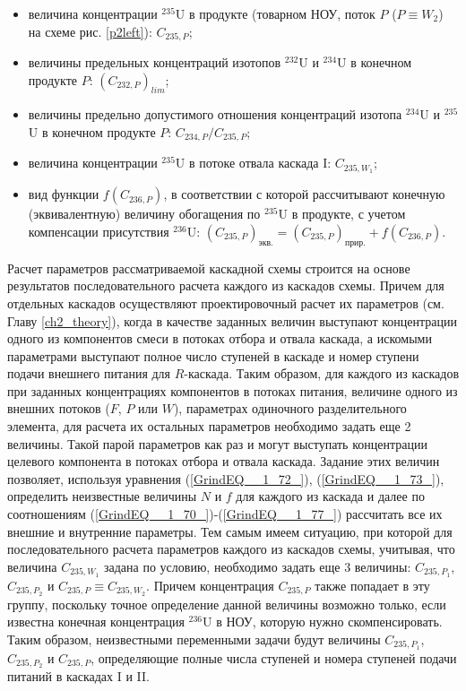 \begin{itemize}
    \item величина концентрации $^{235}$U в продукте (товарном НОУ, поток $P$ ($P \equiv W_2$) на схеме рис. \ref{p2left}): $C_{235,{P}}$;
    \item величины предельных концентраций изотопов $^{232}$U и $^{234}$U в конечном продукте $P$: $(C_{232,{P}})_{lim}$;
    \item величины предельно допустимого отношения концентраций изотопа $^{234}$U и $^{235}$U в конечном продукте $P$: ${C_{234,{P}}}/{C_{235,{P}}}$;
    \item величина концентрации $^{235}$U в потоке отвала каскада I: $C_{235,{W_1}}$;
    \item вид функции $f(C_{236,P})$, в соответствии с которой рассчитывают конечную (эквивалентную) величину обогащения по $^{235}$U в продукте, с учетом компенсации присутствия $^{236}$U:
    $(C_{235,P})_\textit{экв.}=(C_{235,P})_\textit{прир.}+f(C_{236,P})$.    
\end{itemize}

Расчет параметров рассматриваемой каскадной схемы строится на основе результатов последовательного расчета каждого из каскадов схемы. Причем для отдельных каскадов осуществляют проектировочный расчет их параметров (см. Главу \ref{ch2_theory}), когда в качестве заданных величин выступают концентрации одного из компонентов смеси в потоках отбора и отвала каскада, а искомыми параметрами выступают полное число ступеней в каскаде и номер ступени подачи внешнего питания для $R$-каскада. Таким образом, для каждого из каскадов при заданных концентрациях компонентов в потоках питания, величине одного из внешних потоков ($F$, $P$ или $W$), параметрах одиночного разделительного элемента, для расчета их остальных параметров необходимо задать еще 2 величины. Такой парой параметров как раз и могут выступать концентрации целевого компонента в потоках отбора и отвала каскада. Задание этих величин позволяет, используя уравнения (\ref{GrindEQ__1_72_}), (\ref{GrindEQ__1_73_}), определить неизвестные величины $N$ и $f$ для каждого из каскада и далее по соотношениям (\ref{GrindEQ__1_70_})-(\ref{GrindEQ__1_77_}) рассчитать все их внешние и внутренние параметры. Тем самым имеем ситуацию, при которой для последовательного расчета параметров каждого из каскадов схемы, учитывая, что величина $C_{235,{W_1}}$ задана по условию, необходимо задать еще 3 величины: $C_{235,{P_1}}$, $C_{235,{P_2}}$ и $C_{235,{P}}\equiv C_{235,{W_2}}$. Причем концентрация $C_{235,{P}}$ также попадает в эту группу, поскольку точное определение данной величины возможно только, если известна конечная концентрация $^{236}$U в НОУ, которую нужно скомпенсировать. Таким образом, неизвестными переменными задачи будут величины $C_{235,{P_1}}$, $C_{235,{P_2}}$ и $C_{235,{P}}$, определяющие полные числа ступеней и номера ступеней подачи питаний в каскадах I и II.

